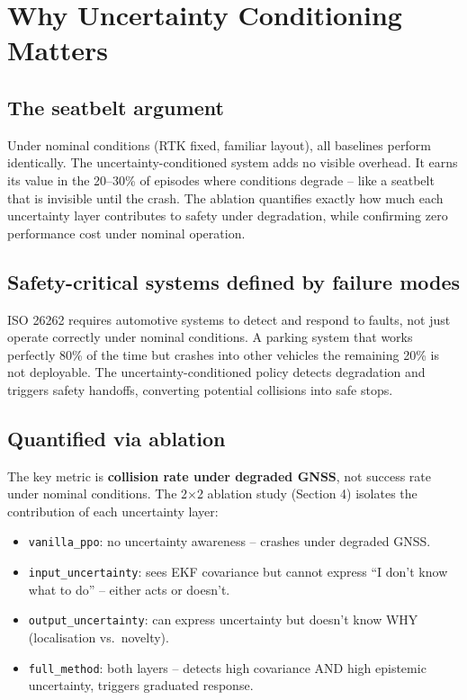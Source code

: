 \documentclass[11pt,a4paper]{article}
\begin{document}
\section{Why Uncertainty Conditioning Matters}

\subsection{The seatbelt argument}

Under nominal conditions (RTK fixed, familiar layout), all baselines perform
identically. The uncertainty-conditioned system adds no visible overhead. It
earns its value in the 20--30\% of episodes where conditions degrade -- like a
seatbelt that is invisible until the crash. The ablation quantifies exactly
how much each uncertainty layer contributes to safety under degradation, while
confirming zero performance cost under nominal operation.

\subsection{Safety-critical systems defined by failure modes}

ISO 26262 requires automotive systems to detect and respond to faults, not
just operate correctly under nominal conditions. A parking system that works
perfectly 80\% of the time but crashes into other vehicles the remaining 20\%
is not deployable. The uncertainty-conditioned policy detects degradation and
triggers safety handoffs, converting potential collisions into safe stops.

\subsection{Quantified via ablation}

The key metric is \textbf{collision rate under degraded GNSS}, not success
rate under nominal conditions. The 2$\times$2 ablation study (Section 4)
isolates the contribution of each uncertainty layer:
\begin{itemize}
  \item \texttt{vanilla\_ppo}: no uncertainty awareness -- crashes under
        degraded GNSS.
  \item \texttt{input\_uncertainty}: sees EKF covariance but cannot express
        ``I don't know what to do'' -- either acts or doesn't.
  \item \texttt{output\_uncertainty}: can express uncertainty but doesn't
        know WHY (localisation vs.\ novelty).
  \item \texttt{full\_method}: both layers -- detects high covariance AND
        high epistemic uncertainty, triggers graduated response.
\end{itemize}
\end{document}

